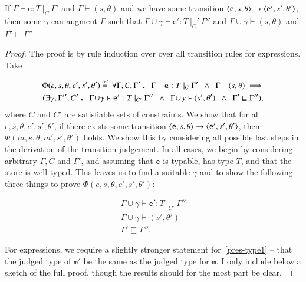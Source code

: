\begin{theorem}\label{pres-expPreservation}
  If $\Gamma\vdash \mathtt{e}:T\ |_C\ \Gamma'$ and $\Gamma\vdash(s, \theta)$ and we have some
  transition $\langle{}\mathtt{e},s,\theta\rangle{}\rightarrow{}\langle{}\mathtt{e'},s',\theta'\rangle$, then some $\gamma$ can augment $\Gamma$ such that
  $\Gamma\!\cup\!\gamma\vdash\mathtt{e'}:T\ |_C'\ \Gamma''$ and $\Gamma\!\cup\!\gamma\vdash(s,\theta)$ and
  $\Gamma'\sqsubseteq\Gamma''$.
\end{theorem}

\begin{proof}
  The proof is by rule induction over over all transition rules for
  expressions. Take 

  \begin{multline*}
 	\Phi(e, s, \theta, e', s', \theta') \eqdef 
	\	\forall\Gamma,C,\Gamma' \qdot
	\Gamma\vdash\mathtt{e}:T\ |_C\ \Gamma' 
	\enspace\land\enspace\Gamma\vdash (s,\theta)
	\implies \\
   	(\exists\gamma,\Gamma'',C'\qdot
    \Gamma\!\cup\!\gamma\vdash \mathtt{e'}:T\ |_{C'}\ \Gamma'' 
	\enspace\land\enspace\Gamma\!\cup\!\gamma\vdash (s',\theta')
	\enspace\land\enspace \Gamma'\sqsubseteq\Gamma''),
  \end{multline*} 
  where $C$ and $C'$ are satisfiable sets of constraints. We show that for all
  $e, s, \theta, e', s', \theta'$, if there exists some transition
  $\langle{}\mathtt{e},s,\theta\rangle{}\rightarrow{}\langle{}\mathtt{e'},s',\theta'\rangle$, then
  $\Phi(m,s,\theta,m',s',\theta')$ holds. We show this by considering all
  possible last steps in the derivation of the transition judgement. In all
  cases, we begin by considering arbitrary $\Gamma, C$ and $\Gamma'$, and
  assuming that $\mathtt{e}$ is typable, has type $T$, and that the store is well-typed. This leaves us to find
  a suitable $\gamma$ and to show the following three things to prove $\Phi(e,s,\theta,e',s',\theta')$:

  \begin{gather}
	\Gamma\!\cup\!\gamma\vdash\mathtt{e'}:T\ |_{C'}\ \Gamma'' \label{pres-type1}\\
	\Gamma\!\cup\!\gamma\vdash(s',\theta') \label{pres-store1} \\
	\Gamma' \sqsubseteq \Gamma'' \label{pres-env1}.
  \end{gather}

  For expressions, we require a slightly stronger statement for~\eqref{pres-type1} -- that
  the judged type of $\mathtt{m'}$ be the same as the judged type for $\mathtt{m}$.
  I only include below a sketch of the full proof, though the results should for the
  most part be clear.


\end{proof}
